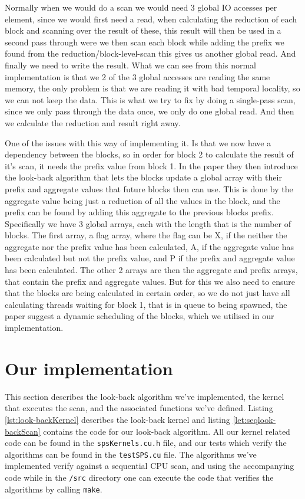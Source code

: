 \documentclass[twocolumn]{article}
\begin{document}
Normally when we would do a scan we would need 3 global IO accesses per element, since we would first need a read, when calculating the reduction of each block and scanning over the result of these, this result will then be used in a second pass through were we then scan each block while adding the prefix we found from the reduction/block-level-scan this gives us another global read. And finally we need to write the result. What we can see from this normal implementation is that we 2 of the 3 global accesses are reading the same memory, the only problem is that we are reading it with bad temporal locality, so we can not keep the data. This is what we try to fix by doing a single-pass scan, since we only pass through the data once, we only do one global read. And then we calculate the reduction and result right away.

One of the issues with this way of implementing it. Is that we now have a dependency between the blocks, so in order for block 2 to calculate the result of it's scan, it needs the prefix value from block 1. In the paper they then introduce the look-back algorithm that lets the blocks update a global array with their prefix and aggregate values that future blocks then can use. This is done by the aggregate value being just a reduction of all the values in the block, and the prefix can be found by adding this aggregate to the previous blocks prefix. 
Specifically we have 3 global arrays, each with the length that is the number of blocks. The first array, a flag array, where the flag can be X, if the neither the aggregate nor the prefix value has been calculated, A, if the aggregate value has been calculated but not the prefix value, and P if the prefix and aggregate value has been calculated. The other 2 arrays are then the aggregate and prefix arrays, that contain the prefix and aggregate values.
But for this we also need to ensure that the blocks are being calculated in certain order, so we do not just have all calculating threads waiting for block 1, that is in queue to being spawned, the paper suggest a dynamic scheduling of the blocks, which we utilised in our implementation.



\section{Our implementation}
\label{Sec:Implementation}
This section describes the look-back algorithm we've implemented, the kernel that executes the scan, and the associated functions we've defined. Listing \ref{lst:look-backKernel} describes the look-back kernel and listing \ref{let:seqlook-backScan} contains the code for our look-back algorithm. All our kernel related code can be found in the \verb|spsKernels.cu.h| file, and our tests which verify the algorithms can be found in the \verb|testSPS.cu| file. The algorithms we've implemented verify against a sequential CPU scan, and using the accompanying code while in the \verb|/src| directory one can execute the code that verifies the algorithms by calling \verb|make|.
\end{document}
